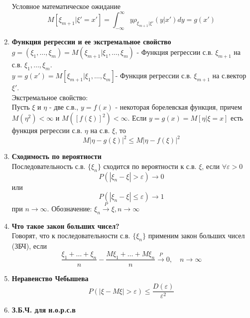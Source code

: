 \documentclass[A4]{article}
\begin{document}
\begin{enumerate}
\begin{equation}
	\end{equation}
	Условное математическое ожидание
	\begin{equation}
	M[\xi_{m+1}|\xi'=x']=\int_{-\infty}^{\infty}y\rho_{\xi_{m+1}|\xi'}(y|x')dy=g(x')
	\end{equation}
	\item \textbf{Функция регрессии и ее экстремальное свойство}\\
	$g=(\xi_1,\ldots,\xi_m)=M(\xi_{m+1}|\xi_1,\ldots,\xi_m)$ - Функция регрессии с.в. $\xi_{m+1}$ на с.в. $\xi_1,\ldots,\xi_m$.\\
	$y=g(x')=M[\xi_{m+1}|\xi_1,\ldots,\xi_m]$- Функция регрессии с.в. $\xi_{m+1}$ на с.вектор $\xi'$.\\
	Экстремальное свойство:\\
	Пусть $\xi$ и $\eta$ - две с.в., $y=f(x)$ - некоторая борелевская функция, причем $M(\eta^2)<\infty$ и $M([f(\xi)]^2)<\infty$. Если $y=g(x)=M[\eta|\xi=x]$ есть функция регрессии с.в. $\eta$ на с.в. $\xi$, то 
	\begin{equation}
	M|\eta-g(\xi)|^2\le M|\eta-f(\xi)|^2
	\end{equation}
	\item \textbf{Сходимость по вероятности}\\
	Последовательность с.в. $\{\xi_n\}$ сходится по вероятности к с.в. $\xi$, если $\forall\varepsilon>0$
	\begin{equation}
	P(|\xi_n-\xi|>\varepsilon)\rightarrow 0
	\end{equation}
	или 
	\begin{equation}
	P(|\xi_n-\xi|\le\varepsilon)\rightarrow 1
	\end{equation}
	при $n\rightarrow\infty$. Обозначение: $\xi_n\stackrel{P}{\rightarrow}\xi,n\rightarrow\infty$
	\item \textbf{Что такое закон больших чисел?}\\
	Говорят, что к последовательности с.в. $\{\xi_n\}$ применим закон больших чисел (ЗБЧ), если
	\begin{equation}
	\frac{\xi_1+\ldots+\xi_n}{n}-\frac{M\xi_1+\ldots+M\xi_n}{n}\stackrel{P}{\rightarrow}0,\quad n\rightarrow \infty
	\end{equation}
	\item \textbf{Неравенство Чебышева}\\
	\begin{equation}
	P(|\xi-M\xi|>\varepsilon)\le \frac{D(\varepsilon)}{\varepsilon^2}
	\end{equation}
	\item \textbf{З.Б.Ч. для н.о.р.с.в}\\

\end{enumerate}
\end{document}

